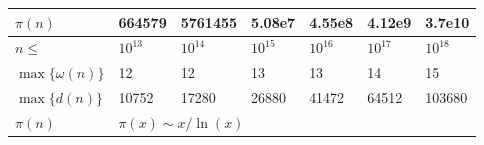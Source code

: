 \begin{table}[H]
{\begin{tabular}{|l|llllll|}
$\pi(n)$            & \multicolumn{1}{l|}{664579}                          & \multicolumn{1}{l|}{5761455}                         & \multicolumn{1}{l|}{5.08e7}                          & \multicolumn{1}{l|}{4.55e8}                            & \multicolumn{1}{l|}{4.12e9}                          & 3.7e10                         \\ \hline
\rowcolor[HTML]{C0C0C0} 
$n\le$              & \multicolumn{1}{l|}{\cellcolor[HTML]{C0C0C0}$10^{13}$} & \multicolumn{1}{l|}{\cellcolor[HTML]{C0C0C0}$10^{14}$} & \multicolumn{1}{l|}{\cellcolor[HTML]{C0C0C0}$10^{15}$} & \multicolumn{1}{l|}{\cellcolor[HTML]{C0C0C0}$10^{16}$}   & \multicolumn{1}{l|}{\cellcolor[HTML]{C0C0C0}$10^{17}$} & $10^{18}$                        \\ \hline
$\max\{\omega(n)\}$ & \multicolumn{1}{l|}{12}                              & \multicolumn{1}{l|}{12}                              & \multicolumn{1}{l|}{13}                              & \multicolumn{1}{l|}{13}                                & \multicolumn{1}{l|}{14}                              & 15                             \\ \hline
$\max\{d(n)\}$      & \multicolumn{1}{l|}{10752}                           & \multicolumn{1}{l|}{17280}                           & \multicolumn{1}{l|}{26880}                           & \multicolumn{1}{l|}{41472}                             & \multicolumn{1}{l|}{64512}                           & 103680                         \\ \hline
$\pi(n)$            & \multicolumn{6}{l|}{$\pi(x)\sim x/\ln(x)$}                                                                                                                                                                                                                                                                          \\ \hline
\end{tabular}
}
\end{table}